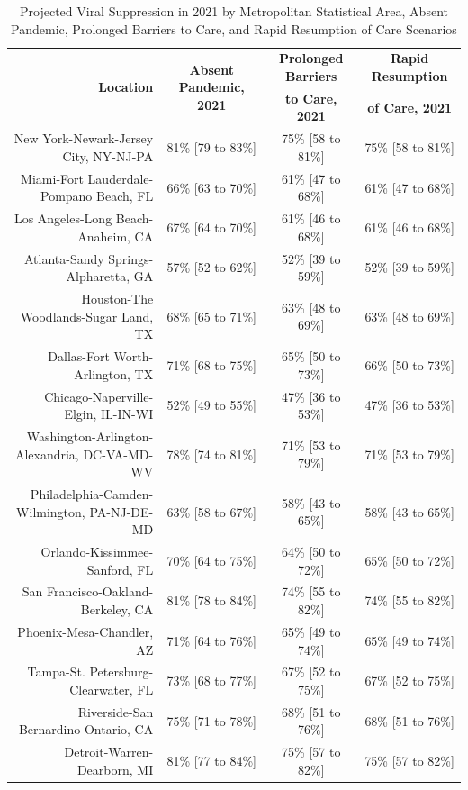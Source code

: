 \documentclass{article}
\begin{document}
\begin{table}[H]
	\caption{Projected Viral Suppression in 2021 by Metropolitan Statistical Area, Absent Pandemic, Prolonged Barriers to Care, and Rapid Resumption of Care Scenarios}
	\footnotesize
	\begin{tabular}{|r|c|c|c|}
		\hline
		\multirow{2}{*}{\textbf{Location}} & \multirow{2}{*}{\textbf{Absent Pandemic, 2021}} & \textbf{Prolonged Barriers} & \textbf{Rapid Resumption}\\
		&  & \textbf{to Care, 2021} & \textbf{of Care, 2021}\\
		\hline\hline
		New York-Newark-Jersey City, NY-NJ-PA & 81\% [79 to 83\%] & 75\% [58 to 81\%] & 75\% [58 to 81\%]\\
		Miami-Fort Lauderdale-Pompano Beach, FL & 66\% [63 to 70\%] & 61\% [47 to 68\%] & 61\% [47 to 68\%]\\
		Los Angeles-Long Beach-Anaheim, CA & 67\% [64 to 70\%] & 61\% [46 to 68\%] & 61\% [46 to 68\%]\\
		Atlanta-Sandy Springs-Alpharetta, GA & 57\% [52 to 62\%] & 52\% [39 to 59\%] & 52\% [39 to 59\%]\\
		Houston-The Woodlands-Sugar Land, TX & 68\% [65 to 71\%] & 63\% [48 to 69\%] & 63\% [48 to 69\%]\\
		Dallas-Fort Worth-Arlington, TX & 71\% [68 to 75\%] & 65\% [50 to 73\%] & 66\% [50 to 73\%]\\
		Chicago-Naperville-Elgin, IL-IN-WI & 52\% [49 to 55\%] & 47\% [36 to 53\%] & 47\% [36 to 53\%]\\
		Washington-Arlington-Alexandria, DC-VA-MD-WV & 78\% [74 to 81\%] & 71\% [53 to 79\%] & 71\% [53 to 79\%]\\
		Philadelphia-Camden-Wilmington, PA-NJ-DE-MD & 63\% [58 to 67\%] & 58\% [43 to 65\%] & 58\% [43 to 65\%]\\
		Orlando-Kissimmee-Sanford, FL & 70\% [64 to 75\%] & 64\% [50 to 72\%] & 65\% [50 to 72\%]\\
		San Francisco-Oakland-Berkeley, CA & 81\% [78 to 84\%] & 74\% [55 to 82\%] & 74\% [55 to 82\%]\\
		Phoenix-Mesa-Chandler, AZ & 71\% [64 to 76\%] & 65\% [49 to 74\%] & 65\% [49 to 74\%]\\
		Tampa-St. Petersburg-Clearwater, FL & 73\% [68 to 77\%] & 67\% [52 to 75\%] & 67\% [52 to 75\%]\\
		Riverside-San Bernardino-Ontario, CA & 75\% [71 to 78\%] & 68\% [51 to 76\%] & 68\% [51 to 76\%]\\
		Detroit-Warren-Dearborn, MI & 81\% [77 to 84\%] & 75\% [57 to 82\%] & 75\% [57 to 82\%]\\

\end{tabular}
\end{table}
\end{document}
